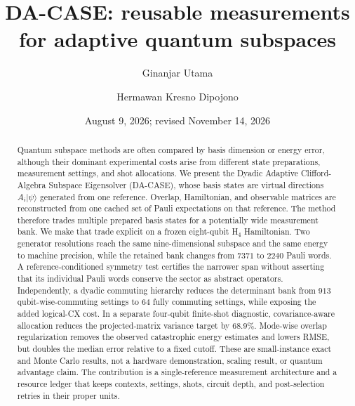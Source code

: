 \documentclass[aps,pra,reprint,superscriptaddress,nofootinbib,floatfix]{revtex4-2}
\newcommand{\ket}[1]{\lvert #1\rangle}
\begin{document}
\title{DA-CASE: reusable measurements for adaptive quantum subspaces}

\author{Ginanjar Utama}

\author{Hermawan Kresno Dipojono}

\date{August 9, 2026; revised November 14, 2026}

\begin{abstract}
Quantum subspace methods are often compared by basis dimension or energy
error, although their dominant experimental costs arise from different state
preparations, measurement settings, and shot allocations.  We present the
Dyadic Adaptive Clifford-Algebra Subspace Eigensolver (DA-CASE), whose basis
states are virtual directions \(A_i\ket{\psi}\) generated from one reference.
Overlap, Hamiltonian, and observable matrices are reconstructed from one
cached set of Pauli expectations on that reference.  The method therefore
trades multiple prepared basis states for a potentially wide measurement bank.
We make that trade explicit on a frozen eight-qubit H$_4$ Hamiltonian.  Two
generator resolutions reach the same nine-dimensional subspace and the same
energy to machine precision, while the retained bank changes from \(7371\) to
\(2240\) Pauli words.  A reference-conditioned symmetry test certifies the
narrower span without asserting that its individual Pauli words conserve the
sector as abstract operators.  Independently, a dyadic commuting hierarchy
reduces the determinant bank from \(913\) qubit-wise-commuting settings to
\(64\) fully commuting settings, while exposing the added logical-CX cost.
In a separate four-qubit finite-shot diagnostic, covariance-aware allocation
reduces the projected-matrix variance target by \(68.9\%\).  Mode-wise overlap
regularization removes the observed catastrophic energy estimates and lowers
RMSE, but doubles the median error relative to a fixed cutoff.  These are
small-instance exact and Monte Carlo results, not a hardware demonstration,
scaling result, or quantum advantage claim.  The contribution is a
single-reference measurement architecture and a resource ledger that keeps
contexts, settings, shots, circuit depth, and post-selection retries in their
proper units.
\end{abstract}

\maketitle
\end{document}

